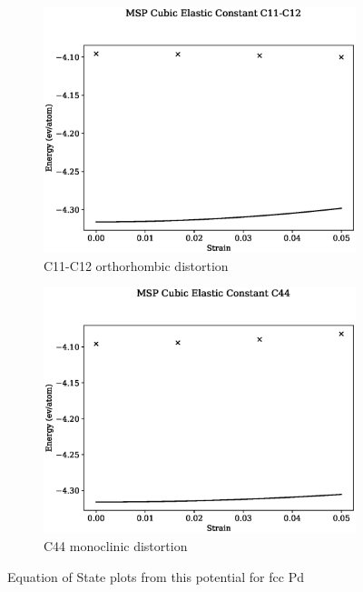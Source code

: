 \begin{figure}[htb]
\begin{subfigure}{.42\textwidth}
  \centering
  \includegraphics[width=.90\linewidth]{chapters/potentials_fe_pd_ru/fepd_potential/ec_mskp/msp_c11_c12_plot_bp_0.eps}  
  \caption{C11-C12 orthorhombic distortion}
  \label{fig:fepd-fefcc-c11c12}
\end{subfigure}
\begin{subfigure}{.42\textwidth}
  \centering
  \includegraphics[width=.90\linewidth]{chapters/potentials_fe_pd_ru/fepd_potential/ec_mskp/msp_c44_plot_bp_0.eps}  
  \caption{C44 monoclinic distortion}
  \label{fig:fepd-fefcc-c44}
\end{subfigure}
\label{fig:feru-fefcc-c11c12c44}
\caption{Equation of State plots from this potential for \acrshort{fcc} Pd}
\end{figure}







